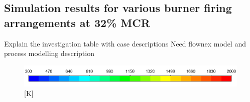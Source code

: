 \documentclass[review]{elsarticle}
\begin{document}
\subsection{Simulation results for various burner firing arrangements at 32\% MCR }


Explain the investigation
table with case descriptions
Need flownex model and process modelling description
\begin{figure}
\centering
\includegraphics[scale = 0.5]{TEMP_KEY} [K]\\
\\

\end{figure}
\end{document}
